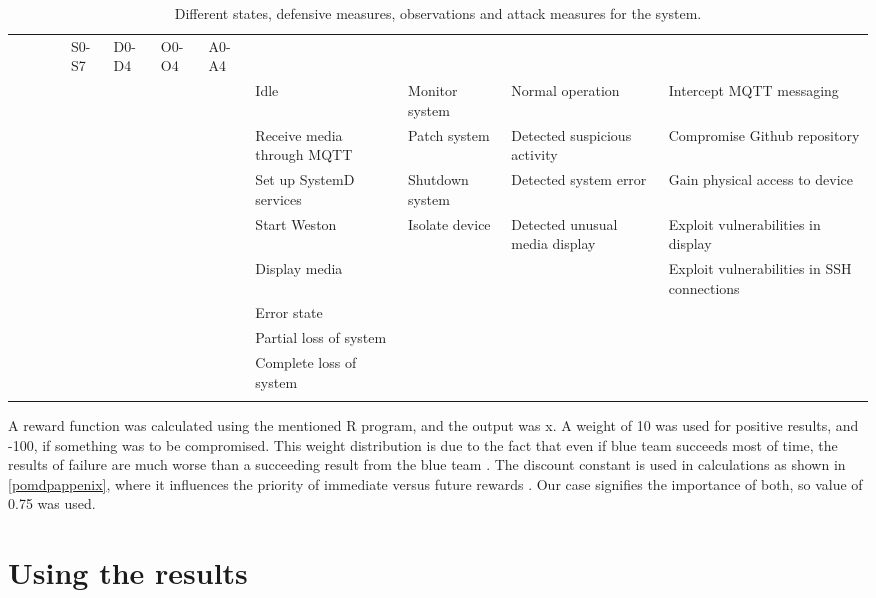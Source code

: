 \begin{landscape}
\begin{table}
\centering
\begin{tabular}{ |c|c|c|c| }
 \hline & & & & S0-S7 & D0-D4 & O0-O4 & A0-A4 \\ & & & & \hline \hline
 & & & & Idle & Monitor system & Normal operation & Intercept MQTT
 messaging \\ & & & & \hline & & & & Receive media through MQTT &
 Patch system & Detected suspicious activity & Compromise Github
 repository \\ & & & & \hline & & & & Set up SystemD services &
 Shutdown system & Detected system error & Gain physical access to
 device \\ & & & & \hline & & & & Start Weston & Isolate device &
 Detected unusual media display & Exploit vulnerabilities in display
 \\ & & & & \hline & & & & Display media & & & Exploit vulnerabilities
 in SSH connections \\ & & & & \hline & & & & Error state & \ & \ & \\ & & & &
 \hline & & & & Partial loss of system & & & \\ & & & & \hline & & & &
 Complete loss of system & & & \\ & & & & \hline

\end{tabular}
\caption{Different states, defensive measures, observations and attack
  measures for the system.}
\label{pomdbtable}
\end{table}
\end{landscape}

A reward function was calculated using the mentioned R program, and the
output was x. A weight of 10 was used for positive results, and -100,
if something was to be compromised. This weight distribution is due to
the fact that even if blue team succeeds most of time, the results of
failure are much worse than a succeeding result from the blue team
\cite{carin2008cybersecurity}. The discount constant is used in
calculations as shown in \ref{pomdpappenix}, where it influences the
priority of immediate versus future rewards \cite{mcabeeMarkov}. Our
case signifies the importance of both, so value of 0.75 was used.

\section{Using the results}

